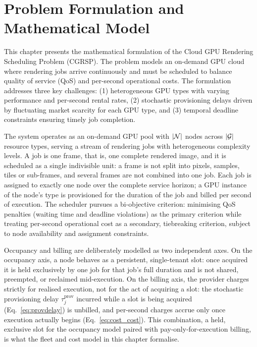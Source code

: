 \chapter{Problem Formulation and Mathematical Model}
\label{chap:formulation}

This chapter presents the mathematical formulation of the Cloud GPU Rendering Scheduling Problem (CGRSP). The problem models an on-demand GPU cloud where rendering jobs arrive continuously and must be scheduled to balance quality of service (QoS) and per-second operational costs. The formulation addresses three key challenges: (1) heterogeneous GPU types with varying performance and per-second rental rates, (2) stochastic provisioning delays driven by fluctuating market scarcity for each GPU type, and (3) temporal deadline constraints ensuring timely job completion.

The system operates as an on-demand GPU pool with $|\mathcal{N}|$ nodes across $|\mathcal{G}|$ resource types, serving a stream of rendering jobs with heterogeneous complexity levels. A job is one frame, that is, one complete rendered image, and it is scheduled as a single indivisible unit: a frame is not split into pixels, samples, tiles or sub-frames, and several frames are not combined into one job. Each job is assigned to exactly one node over the complete service horizon; a GPU instance of the node's type is provisioned for the duration of the job and billed per second of execution. The scheduler pursues a bi-objective criterion: minimising QoS penalties (waiting time and deadline violations) as the primary criterion while treating per-second operational cost as a secondary, tiebreaking criterion, subject to node availability and assignment constraints.

Occupancy and billing are deliberately modelled as two independent axes. On the occupancy axis, a node behaves as a persistent, single-tenant slot: once acquired it is held exclusively by one job for that job's full duration and is not shared, preempted, or reclaimed mid-execution. On the billing axis, the provider charges strictly for realised execution, not for the act of acquiring a slot: the stochastic provisioning delay $\tau^{\text{prov}}_j$ incurred while a slot is being acquired (Eq.~\ref{eq:provdelay}) is unbilled, and per-second charges accrue only once execution actually begins (Eq.~\ref{eq:cost_cost}). This combination, a held, exclusive slot for the occupancy model paired with pay-only-for-execution billing, is what the fleet and cost model in this chapter formalise.

